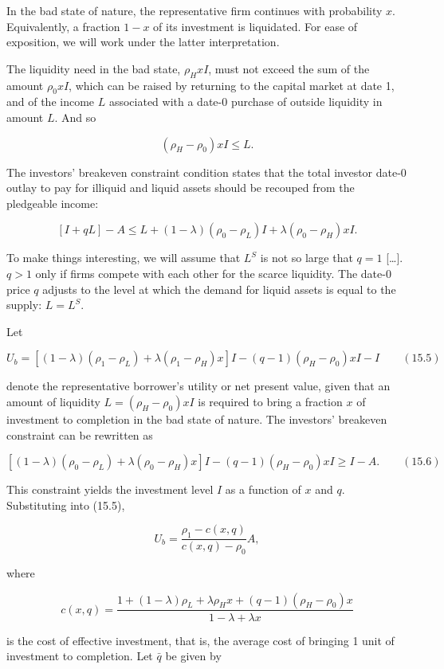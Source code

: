 \documentclass[11pt,a4paper]{article}
\begin{document}
In the bad state of nature, the representative firm continues with probability \(x\). Equivalently,
a fraction \(1 - x\) of its investment is liquidated. For ease of exposition, we will work under the
latter interpretation.

The liquidity need in the bad state, \(\rho_H xI\), must not exceed the sum of the amount
\(\rho_0 xI\), which can be raised by returning to the capital market at date 1, and of the income
\(L\) associated with a date-0 purchase of outside liquidity in amount \(L\). And so

\[(\rho_H - \rho_0)xI \leqslant L.\]

The investors' breakeven constraint condition states that the total investor date-0 outlay to pay
for illiquid and liquid assets should be recouped from the pledgeable income:

\[[I + qL] - A \leqslant L + (1 - \lambda)(\rho_0 - \rho_L)I + \lambda(\rho_0 - \rho_H)xI.\]

To make things interesting, we will assume that \(L^S\) is not so large that \(q = 1\) {[}\ldots{]}.
\(q > 1\) only if firms compete with each other for the scarce liquidity. The date-0 price \(q\)
adjusts to the level at which the demand for liquid assets is equal to the supply: \(L = L^S\).

Let

\[U_b = [(1 - \lambda)(\rho_1 - \rho_L) + \lambda(\rho_1 - \rho_H)x]I - (q - 1)(\rho_H - \rho_0)xI - I \qquad (15.5)\]

denote the representative borrower's utility or net present value, given that an amount of liquidity
\(L = (\rho_H - \rho_0)xI\) is required to bring a fraction \(x\) of investment to completion in the
bad state of nature. The investors' breakeven constraint can be rewritten as

\[[(1 - \lambda)(\rho_0 - \rho_L) + \lambda(\rho_0 - \rho_H)x]I - (q - 1)(\rho_H - \rho_0)xI \geqslant I - A. \qquad (15.6)\]

This constraint yields the investment level \(I\) as a function of \(x\) and \(q\). Substituting
into (15.5),

\[U_b = \frac{\rho_1 - c(x, q)}{c(x, q) - \rho_0}A,\]

where

\[c(x, q) = \frac{1 + (1 - \lambda)\rho_L + \lambda\rho_H x + (q - 1)(\rho_H - \rho_0)x}{1 - \lambda + \lambda x}\]

is the cost of effective investment, that is, the average cost of bringing 1 unit of investment to
completion. Let \(\bar q\) be given by
\end{document}
